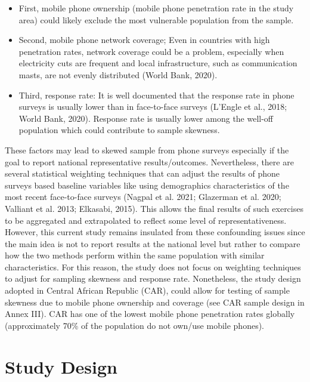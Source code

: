 \documentclass[11pt,harvard]{article}
\begin{document}
	\begin{itemize}[label=--, left=1.5em]
		\item[1]	First, mobile phone ownership (mobile phone penetration rate in the study area) could likely exclude the most vulnerable population from the sample. 
		
		\item[2]	Second, mobile phone network coverage; Even in countries with high penetration rates, network coverage could be a problem, especially when electricity cuts are frequent and local infrastructure, such as communication masts, are not evenly distributed (World Bank, 2020).
		
		\item[3]	Third, response rate: It is well documented that the response rate in phone surveys is usually lower than in face-to-face surveys (L’Engle et al., 2018; World Bank, 2020). Response rate is usually lower among the well-off population which could contribute to sample skewness.
	\end{itemize}
	
	These factors may lead to skewed sample from phone surveys especially if the goal to report national representative results/outcomes. Nevertheless, there are several statistical weighting techniques that can adjust the results of phone surveys based baseline variables like using demographics characteristics of the most recent face-to-face surveys (Nagpal et al. 2021; Glazerman et al. 2020; Valliant et al. 2013; Elkasabi, 2015). This allows the final results of such exercises to be aggregated and extrapolated to reflect some level of representativeness. However, this current study remains insulated from these confounding issues since the main idea is not to report results at the national level but rather to compare how the two methods perform within the same population with similar characteristics. For this reason, the study does not focus on weighting techniques to adjust for sampling skewness and response rate. Nonetheless, the study design adopted in Central African Republic (CAR), could allow for testing of sample skewness due to mobile phone ownership and coverage (see CAR sample design in Annex III). CAR has one of the lowest mobile phone penetration rates globally (approximately 70\% of the population do not own/use mobile phones).
	
	\pagebreak
	
	\section{Study Design}
	
\end{document}
